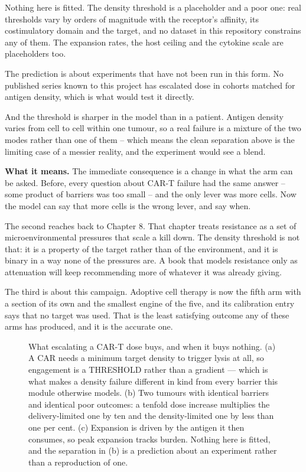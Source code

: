 \documentclass[11pt,twoside,openright]{report}
\begin{document}
\begin{refusal}
Nothing here is fitted. The density threshold is a placeholder and a poor one: real thresholds vary by orders of magnitude with the receptor's affinity, its costimulatory domain and the target, and no dataset in this repository constrains any of them. The expansion rates, the host ceiling and the cytokine scale are placeholders too.

The prediction is about experiments that have not been run in this form. No published series known to this project has escalated dose in cohorts matched for antigen density, which is what would test it directly.

And the threshold is sharper in the model than in a patient. Antigen density varies from cell to cell within one tumour, so a real failure is a mixture of the two modes rather than one of them -- which means the clean separation above is the limiting case of a messier reality, and the experiment would see a blend.
\end{refusal}

\textbf{What it means.} The immediate consequence is a change in what the arm can be asked. Before, every question about CAR-T failure had the same answer -- some product of barriers was too small -- and the only lever was more cells. Now the model can say that more cells is the wrong lever, and say when.

The second reaches back to Chapter 8. That chapter treats resistance as a set of microenvironmental pressures that scale a kill down. The density threshold is not that: it is a property of the target rather than of the environment, and it is binary in a way none of the pressures are. A book that models resistance only as attenuation will keep recommending more of whatever it was already giving.

The third is about this campaign. Adoptive cell therapy is now the fifth arm with a section of its own and the smallest engine of the five, and its calibration entry says that no target was used. That is the least satisfying outcome any of these arms has produced, and it is the accurate one.

\begin{figure}[tbp]
\setcounter{figure}{34}
\caption{What escalating a CAR-T dose buys, and when it buys nothing. (a) A CAR needs a minimum target density to trigger lysis at all, so engagement is a THRESHOLD rather than a gradient --- which is what makes a density failure different in kind from every barrier this module otherwise models. (b) Two tumours with identical barriers and identical poor outcomes: a tenfold dose increase multiplies the delivery-limited one by ten and the density-limited one by less than one per cent. (c) Expansion is driven by the antigen it then consumes, so peak expansion tracks burden. Nothing here is fitted, and the separation in (b) is a prediction about an experiment rather than a reproduction of one.}
\label{fig:fig39_adoptive_escalation}
\end{figure}
\end{document}
